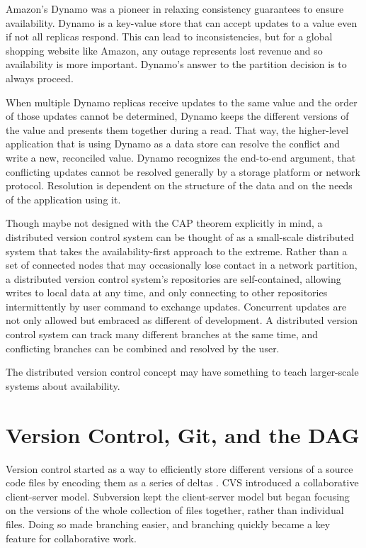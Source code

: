 Amazon's Dynamo\cite{dynamo} was a pioneer in relaxing consistency guarantees to
ensure availability. Dynamo is a key-value store that can accept updates to a
value even if not all replicas respond. This can lead to inconsistencies, but
for a global shopping website like Amazon, any outage represents lost revenue
and so availability is more important. Dynamo's answer to the partition decision
is to always proceed.

When multiple Dynamo replicas receive updates to the same value and the order of
those updates cannot be determined, Dynamo keeps the different versions of the
value and presents them together during a read. That way, the higher-level
application that is using Dynamo as a data store can resolve the conflict and
write a new, reconciled value. Dynamo recognizes the end-to-end
argument\cite{endtoendargument}, that conflicting updates cannot be resolved
generally by a storage platform or network protocol. Resolution is dependent on
the structure of the data and on the needs of the application using it.

Though maybe not designed with the CAP theorem explicitly in mind, a distributed
version control system can be thought of as a small-scale distributed system
that takes the availability-first approach to the extreme. Rather than a set of
connected nodes that may occasionally lose contact in a network partition, a
distributed version control system's repositories are self-contained, allowing
writes to local data at any time, and only connecting to other repositories
intermittently by user command to exchange updates. Concurrent updates are not
only allowed but embraced as different  of development. A
distributed version control system can track many different branches at the same
time, and conflicting branches can be combined and resolved by the user.

The distributed version control concept may have something to teach larger-scale
systems about availability.

%



\section{Version Control, Git, and the DAG}


Version control started as a way to efficiently store different versions of a
source code files by encoding them as a series of deltas
\cite{history_of_version_control}. CVS introduced a collaborative client-server
model. Subversion kept the client-server model but began focusing on the
versions of the whole collection of files together, rather than individual
files. Doing so made branching easier, and branching quickly became a key
feature for collaborative work.

